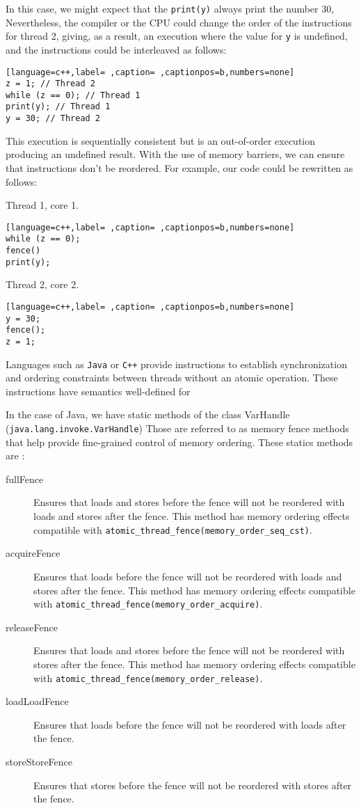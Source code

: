 In this case, we might expect that the \texttt{print(y)} always print the number 30,
Nevertheless, the compiler or the CPU could change the order of the
instructions for thread 2, giving, as a result, an execution where the value
for \texttt{y} is undefined, and the instructions could be interleaved as follows:

\begin{lstlisting}[language=c++,label= ,caption= ,captionpos=b,numbers=none]
z = 1; // Thread 2
while (z == 0); // Thread 1
print(y); // Thread 1
y = 30; // Thread 2
\end{lstlisting}

This execution is sequentially consistent but is an out-of-order
execution producing an undefined result. With the use of memory barriers, we
can ensure that instructions don't be reordered. For example, our code could
be rewritten as follows:

Thread 1, core 1.
\begin{lstlisting}[language=c++,label= ,caption= ,captionpos=b,numbers=none]
while (z == 0);
fence()
print(y);
\end{lstlisting}

Thread 2, core 2.
\begin{lstlisting}[language=c++,label= ,caption= ,captionpos=b,numbers=none]
y = 30;
fence();
z = 1;
\end{lstlisting}


Languages such as \texttt{Java} or \texttt{C++} provide instructions to establish synchronization
and ordering constraints between threads without an atomic operation. These
instructions have semantics well-defined for

In the case of Java, we have static methods of the class VarHandle
(\texttt{java.lang.invoke.VarHandle}) Those are referred to as memory fence methods that help provide fine-grained control of memory ordering. These statics
methods are \cite{varHandleJdk92017}:

\begin{description}
\item[{fullFence}] Ensures that loads and stores before the fence will not be
reordered with loads and stores after the fence. This method has memory
ordering effects compatible with
\texttt{atomic\_thread\_fence(memory\_order\_seq\_cst)}.
\item[{acquireFence}] Ensures that loads before the fence will not be reordered
with loads and stores after the fence. This method has memory ordering
effects compatible with \texttt{atomic\_thread\_fence(memory\_order\_acquire)}.
\item[{releaseFence}] Ensures that loads and stores before the fence will not
be reordered with stores after the fence. This method has memory ordering
effects compatible with \texttt{atomic\_thread\_fence(memory\_order\_release)}.
\item[{loadLoadFence}] Ensures that loads before the fence will not be
reordered with loads after the fence.
\item[{storeStoreFence}] Ensures that stores before the fence will not be
reordered with stores after the fence.
\end{description}

